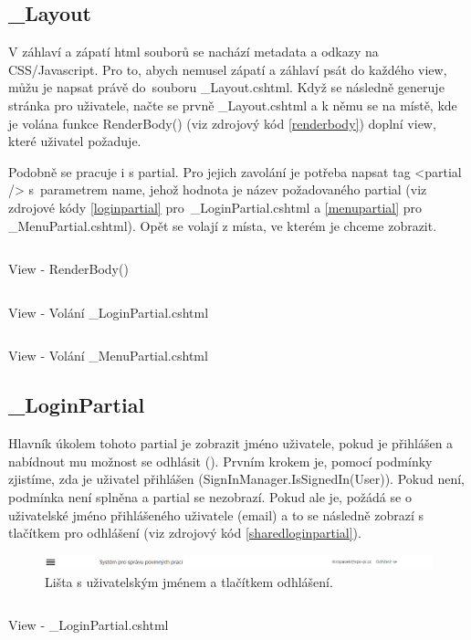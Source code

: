 \documentclass[a4paper, 12pt]{report}
\begin{document}
	\subsection{\_Layout}
	V záhlaví a zápatí html souborů se nachází metadata a odkazy na CSS/Javascript. Pro to, abych nemusel zápatí a záhlaví psát do každého view, můžu je napsat právě do~souboru \_Layout.cshtml. Když se následně generuje stránka pro uživatele, načte se prvně \_Layout.cshtml a k němu se na místě, kde je volána funkce RenderBody() (viz zdrojový kód \ref{renderbody}) doplní view, které uživatel požaduje.\par
	Podobně se pracuje i s partial. Pro jejich zavolání je potřeba napsat tag <partial /> s~parametrem name, jehož hodnota je název požadovaného partial (viz zdrojové kódy \ref{loginpartial} pro~\_LoginPartial.cshtml a \ref{menupartial} pro \_MenuPartial.cshtml). Opět se volají z místa, ve kterém je chceme zobrazit.
	\begin{listing}[H]
		\inputminted{html}{SourceCode/Views/Body.html}
		\caption{View - RenderBody()}
		\label{renderbody}
	\end{listing}
	\begin{listing}[H]
		\inputminted{html}{SourceCode/Views/LoginPartial.html}
		\caption{View - Volání \_LoginPartial.cshtml}
		\label{loginpartial}
	\end{listing}
	\begin{listing}[H]
		\inputminted{html}{SourceCode/Views/MenuPartial.html}
		\caption{View - Volání \_MenuPartial.cshtml}
		\label{menupartial}
	\end{listing}

	\subsection{\_LoginPartial} \label{LoginPartial}
	Hlavník úkolem tohoto partial je zobrazit jméno uživatele, pokud je přihlášen a nabídnout mu možnost se odhlásit (). Prvním krokem je, pomocí podmínky zjistíme, zda je uživatel přihlášen (SignInManager.IsSignedIn(User)). Pokud není, podmínka není splněna a partial se nezobrazí. Pokud ale je, požádá se o uživatelské jméno přihlášeného uživatele (email) a to se následně zobrazí s tlačítkem pro odhlášení (viz zdrojový kód \ref{sharedloginpartial}).
	\begin{figure}[h!]
		\includegraphics[width=\textwidth]{ListaPrihlaseny}
		\caption{Lišta s uživatelským jménem a tlačítkem odhlášení.}
		\label{ListaPrihlaseny}
	\end{figure}
	\begin{listing}[H]
		\inputminted{html}{SourceCode/Views/Shared/_LoginPartial.html}
		\caption{View - \_LoginPartial.cshtml}
		\label{sharedloginpartial}
	\end{listing}
\end{document}
